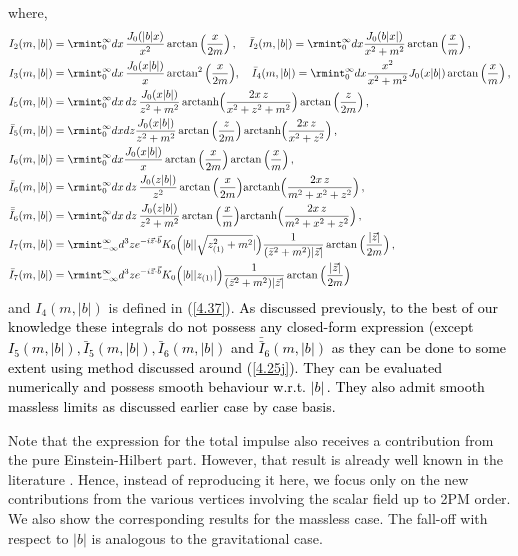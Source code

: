 where, \begin{align}
    \begin{split}
    &I_2(m,|b|)=\rmint _{0}^{\infty}dx\,\frac{J_{0}(|b|x)}{x^2}\arctan\Big(\frac{x}{2m}\Big)\,,\quad 
    \bar{I}_{2}(m,|b|)=\rmint_{0}^\infty dx\frac{J_{0}(b|x|)}{x^2+m^2}\arctan\Big(\frac{x}{m}\Big)\,,\\ &
    I_{3}(m,|b|)=\rmint_{0}^\infty dx\, \frac{J_{0}(x|b|)}{x}\arctan^2\Big(\frac{x}{2m}\Big),\quad
    \bar{I}_{4}(m,|b|)=\rmint_0^\infty dx \frac{x^2}{x^2+m^2}J_{0}(x|b|)\arctan\Big(\frac{x}{m}\Big)\,,\\&
    I_{5}(m,|b|)=\rmint_0^{\infty} dx \,dz \,\frac{J_{0}(x|b|)}{z^2+m^2}\,\textrm{arctanh}\Big(\frac{2 x\,z}{x^2+z^2+m^2}\Big)\arctan\Big(\frac{z}{2m}\Big)\,,\\&
    \bar{I}_{5}(m,|b|)=\rmint_0^\infty dx  dz \frac{J_0(x|b|)}{z^2+m^2}\arctan\Big(\frac{z}{2m}\Big)\, \textrm{arctanh}\Big(\frac{2x\,z}{x^2+z^2}\Big)\,,\\&
    I_{6}(m,|b|)=\rmint_0^{\infty} dx \frac{J_{0}(x|b|)}{x}\arctan\Big(\frac{x}{2m}\Big)\arctan\Big(\frac{x}{m}\Big)\,,\\&
    \bar{I}_{6}(m,|b|)=\rmint_0^\infty dx \,dz\,\frac{J_{0}(z |b|)}{z^2}\arctan\Big(\frac{x}{2m}\Big)\textrm{arctanh}\Big(\frac{2x\,z}{m^2+x^2+z^2}\Big)\,,\\&
    \bar{\bar{I}}_6(m,|b|)=\rmint_0^\infty dx\,dz\,\frac{J_{0}(z |b|)}{z^2+m^2}\arctan\Big(\frac{x}{m}\Big)\textrm{arctanh}\Big(\frac{2x\,z}{m^2+x^2+z^2}\Big)\,,\\&
   I_{7}(m,|b|)= \rmint_{-\infty}^{\infty} d^3 z e^{-i \vec z\cdot \vec b}K_{0}\Big(|b||\sqrt{z_{(1)}^2+m^2}|\Big)\frac{1}{(\bar z^2+m^2)|\vec z|}\arctan\Big(\frac{|\vec z|}{2m}\Big)\,,\\&
   \bar{I}_{7}(m,|b|)=\rmint_{-\infty}^{\infty} d^3 z e^{-i \vec z\cdot \vec b}K_{0}\Big(|b||{z_{(1)}}|\Big)\frac{1}{(\vec{z}^2+m^2)|\vec z|}\arctan\Big(\frac{|\vec z|}{2m}\Big) \label{4.86}
    \end{split}
\end{align}
and $I_{4}(m,|b|)$ is defined in (\ref{4.37}). \textcolor{black}{As discussed previously, to the best of our knowledge these integrals do not possess any closed-form expression (except $I_5(m,|b|),\bar{I}_5(m,|b|), \bar{I}_6(m,|b|)$ and $\bar{\bar{I}}_6(m,|b|)$ as they can be done to some extent using method discussed around (\ref{4.25j}). They can be evaluated numerically and possess smooth behaviour w.r.t. $|b|\,.$ They also admit smooth massless limits as discussed earlier case by case basis.} \par
Note that the expression for the total impulse also receives a contribution from the pure Einstein-Hilbert part. However, that result is already well known in the literature \cite{Mogull:2020sak}. Hence, instead of reproducing it here, we focus only on the new contributions from the various vertices involving the scalar field up to 2PM order. We also show the corresponding results for the massless case. The fall-off with respect to $|b|$ is analogous to the gravitational case.

